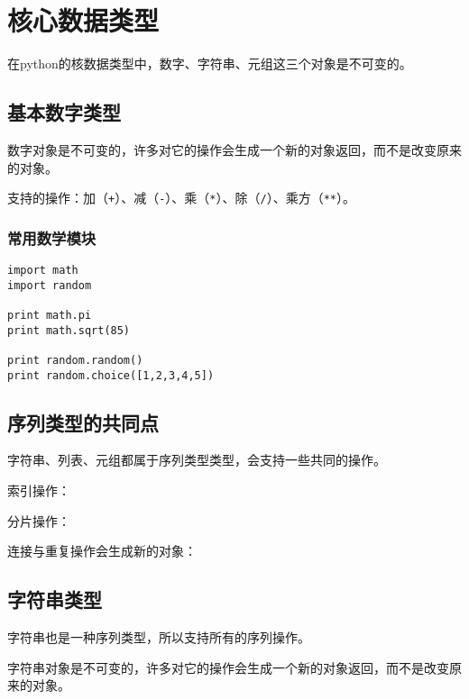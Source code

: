 

\chapter{核心数据类型}

	在python的核数据类型中，数字、字符串、元组这三个对象是不可变的。

	\section{基本数字类型}
		
		数字对象是不可变的，许多对它的操作会生成一个新的对象返回，而不是改变原来的对象。

		支持的操作：加（\verb|+|）、减（\verb|-|）、乘（\verb|*|）、除（\verb|/|）、乘方（\verb|**|）。

		\subsection{常用数学模块}


\begin{lstlisting}
import math
import random

print math.pi
print math.sqrt(85)

print random.random()
print random.choice([1,2,3,4,5])
\end{lstlisting}

	\section{序列类型的共同点}
		
		字符串、列表、元组都属于序列类型类型，会支持一些共同的操作。

		索引操作：

		

		分片操作：
		

		连接与重复操作会生成新的对象：
		

	\section{字符串类型}

		字符串也是一种序列类型，所以支持所有的序列操作。

		字符串对象是不可变的，许多对它的操作会生成一个新的对象返回，而不是改变原来的对象。

